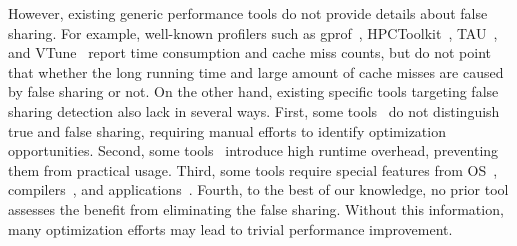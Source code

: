 However, existing generic performance tools do not provide details about false sharing. For example, well-known profilers such as gprof~\cite{gprof}, HPCToolkit~\cite{ibs-sc}, TAU~\cite{Malony-etal:2008:TAU}, and VTune~\cite{Intel:VTune} report time consumption and cache miss counts, but do not point that whether the long running time and large amount of cache misses are caused by false sharing or not. On the other hand, existing specific tools targeting false sharing detection also lack in several ways. First, some tools~\cite{falseshare:binaryinstrumentation1,detect:ptu,detect:intel,falseshare:binaryinstrumentation2,DProf, qinzhao, OSdetection, mldetect, Wicaksono11detectingfalse, openmp} do not distinguish true and false sharing, requiring manual efforts to identify optimization opportunities. Second, some tools~\cite{falseshare:binaryinstrumentation1,falseshare:binaryinstrumentation2,falseshare:simulator, Predator} introduce high runtime overhead, preventing them from practical usage. Third, some tools require special features from OS~\cite{OSdetection}, compilers~\cite{Predator}, and applications~\cite{sheriff}. Fourth, to the best of our knowledge, no prior tool assesses the benefit from eliminating the false sharing. Without this information, many optimization efforts may lead to trivial performance improvement.

\vspace{0.2in}

